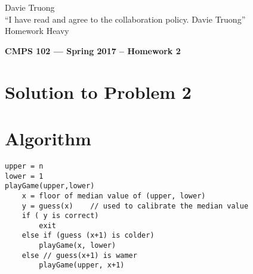 \documentclass[11pt]{article}
\begin{document}
\begin{text} 
Davie Truong\\
“I have read and agree to the collaboration policy. Davie Truong”\\
Homework Heavy \\
\end{text}

\begin{center}
{\bf\Large CMPS 102 --- Spring 2017 --  Homework 2}
\end{center}

\section*{Solution to Problem 2}

\section*{Algorithm} 
\begin{lstlisting}
upper = n 
lower = 1
playGame(upper,lower) 
	x = floor of median value of (upper, lower)
	y = guess(x)  	// used to calibrate the median value 
	if ( y is correct)
		exit
	else if (guess (x+1) is colder) 
		playGame(x, lower) 
	else // guess(x+1) is wamer
		playGame(upper, x+1)
\end{lstlisting}
\end{document}
